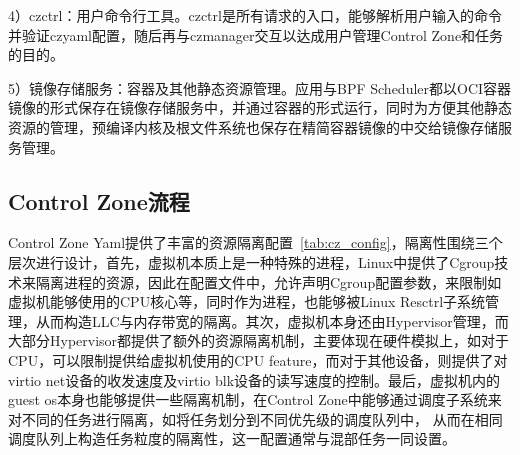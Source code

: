 4）czctrl：用户命令行工具。czctrl是所有请求的入口，能够解析用户输入的命令并验证czyaml配置，随后再与czmanager交互以达成用户管理Control Zone和任务的目的。

5）镜像存储服务：容器及其他静态资源管理。应用与BPF Scheduler都以OCI容器镜像的形式保存在镜像存储服务中，并通过容器的形式运行，同时为方便其他静态资源的管理，预编译内核及根文件系统也保存在精简容器镜像的中交给镜像存储服务管理。

\subsection{Control Zone流程}



Control Zone Yaml提供了丰富的资源隔离配置~\ref{tab:cz_config}，隔离性围绕三个层次进行设计，首先，虚拟机本质上是一种特殊的进程，Linux中提供了Cgroup技术来隔离进程的资源，因此在配置文件中，允许声明Cgroup配置参数，来限制如虚拟机能够使用的CPU核心等，同时作为进程，也能够被Linux Resctrl子系统管理，从而构造LLC与内存带宽的隔离。其次，虚拟机本身还由Hypervisor管理，而大部分Hypervisor都提供了额外的资源隔离机制，主要体现在硬件模拟上，如对于CPU，可以限制提供给虚拟机使用的CPU feature，而对于其他设备，则提供了对virtio net设备的收发速度及virtio blk设备的读写速度的控制。最后，虚拟机内的guest os本身也能够提供一些隔离机制，在Control Zone中能够通过调度子系统来对不同的任务进行隔离，如将任务划分到不同优先级的调度队列中， 从而在相同调度队列上构造任务粒度的隔离性，这一配置通常与混部任务一同设置。


